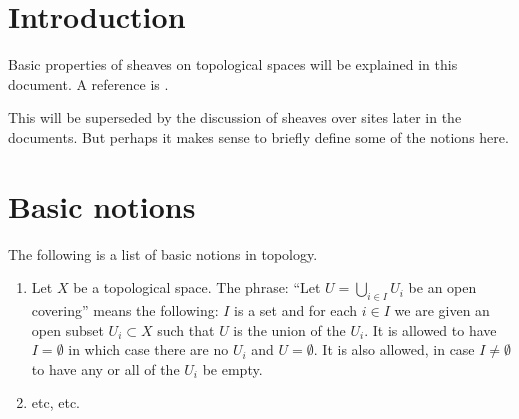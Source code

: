 \section{Introduction}
\label{sheaves-section-introduction}
Basic properties of sheaves on topological spaces
will be explained in this document.
A reference is \cite{Godement}.

\medskip\noindent
This will be superseded by the discussion of sheaves
over sites later in the documents. But perhaps it makes
sense to briefly define some of the notions here.

\section{Basic notions}
\label{sheaves-section-sheaves-basic}
The following is a list of basic notions in topology.

\begin{enumerate}
\item Let $X$ be a topological space. The phrase: ``Let
$U = \bigcup_{i \in I} U_i$ be an open covering'' means the
following: $I$ is a set and for each $i \in I$ we are given
an open subset $U_i \subset X$ such that $U$ is the
union of the $U_i$. It is allowed to have $I = \emptyset$
in which case there are no $U_i$ and $U = \emptyset$.
It is also allowed, in case $I \not = \emptyset$ to have
any or all of the $U_i$ be empty.
\item etc, etc.
\end{enumerate}

